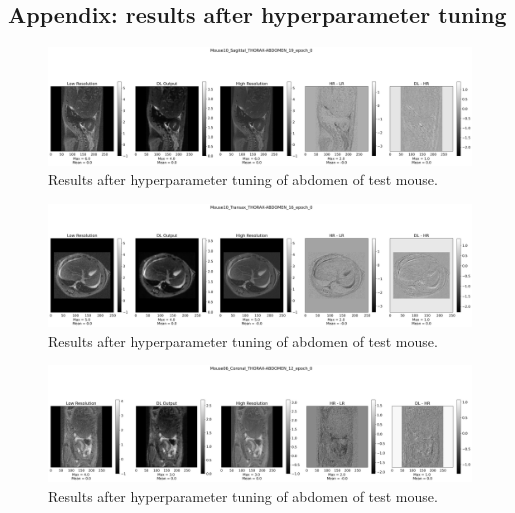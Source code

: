 \documentclass[twocolumn]{article}
\begin{document}
\begin{appendices}
\subsection{Appendix: results after hyperparameter tuning}
\label{Appendix: results after tuning}
\begin{figure}[h]
    \centering
    \includegraphics[width=1\linewidth]{Mouse10_Sagittal_THORAX-ABDOMEN_19_epoch_0.png}
    \caption{Results after hyperparameter tuning of abdomen of test mouse.}
\end{figure}

\begin{figure}[h]
    \centering
    \includegraphics[width=1\linewidth]{Mouse10_Transax_THORAX-ABDOMEN_16_epoch_0.png}
    \caption{Results after hyperparameter tuning of abdomen of test mouse.}
\end{figure}

\begin{figure}[h]
    \centering
    \includegraphics[width=1\linewidth]{Mouse06_Coronal_THORAX-ABDOMEN_12_epoch_0.png}
    \caption{Results after hyperparameter tuning of abdomen of test mouse.}
\end{figure}


\end{appendices}
\end{document}
